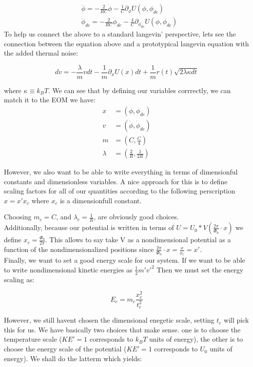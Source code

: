 \documentclass[paper=a4, twocolumn, fontsize=10pt]{article} %
\numberwithin{equation}{section} %
\numberwithin{figure}{section} %
\numberwithin{table}{section} %
\begin{document}
\begin{align}
    &\ddot{\phi} = -\frac{2}{RC} \dot{\phi} -\frac{1}{C} \partial_\phi U(\phi, \phi_{dc})
    \\
    &\ddot{\phi}_{dc} = -\frac{2}{RC} \dot{\phi}_{dc} - \frac{4}{C}\partial_{\phi_{dc}} U(\phi, \phi_{dc})
    \end{align}
To help us connect the above to a standard langevin' perspective, lets see the connection between the equation above and a prototypical langevin equation with the added thermal noise:

\[ dv = -\frac{\lambda}{m} v dt - \frac{1}{m} \partial_x U(x) dt + \frac{1}{m} r(t)\sqrt{2\lambda \kappa dt} \]

where $\kappa\equiv k_B T$. We can see that by defining our variables corrrectly, we can match it to the EOM we have:
\begin{align*}
x &= (\phi, \phi_{dc}) \\
v &= (\dot{\phi}, \dot{\phi}_{dc}) \\
m &= ( C, \frac{C}{4}) \\
\lambda &= (\frac{2}{R}, \frac{1}{2R})
\end{align*}

However, we also want to be able to write everything in terms of dimensionful constants and dimensionless variables. A nice approach for this is to define scaling factors for all of our quantities according to the following perscription $ x = x' x_c$ where $x_c$ is a dimensionfull constant.

Choosing $m_c = C $, and $\lambda_c = \frac{1}{R}$, are obviously good choices. 
\\
Additionally, because our potential is written in terms of $U = U_0 * V(\frac{2\pi}{\Phi_0} \cdot x) $ we define $x_c = \frac{\Phi_0}{2\pi}$. This allows to say take V as a nondimensional potential as a function of the nondimensionalized positions since $\frac{2\pi}{\Phi_0} \cdot x = \frac{x}{x_c} = x' $.
\\
Finally, we want to set a good energy scale for our system. If we want to be able to write nondimensional kinetic energies as $\frac{1}{2} m' v'^2$ Then we must set the energy scaling as:

\[ E_c  = m_c \frac{ x^2_c}{t^2_c} \]

However, we still havent chosen the dimensional enegetic scale, setting $t_c$ will pick this for us. We have basically two choices that make sense. one is to choose the temperature scale ($KE'=1$ corresponds to $k_B T$ units of energy), the other is to choose the energy scale of the potential ($KE'=1$ corresponds to $U_0$ units of energy). We shall do the latterm which yields:
\end{document}
